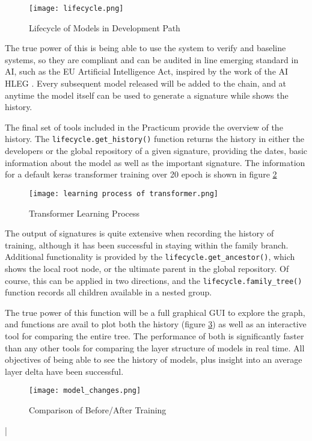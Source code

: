 \begin{figure}[!ht]
    \centering
    \texttt{[image: lifecycle.png]}
    \caption{Lifecycle of Models in Development Path}
    \label{fig:lifecycle_in real}
\end{figure}

The true power of this is being able to use the system to verify and baseline systems, so they are compliant and can be audited in line emerging standard in AI, such as the EU Artificial Intelligence Act, inspired by the work of the AI HLEG \cite{high-levelexpertgrouponaiEthicsGuidelinesTrustworthy2019}. Every subsequent model released will be added to the chain, and at anytime the model itself can be used to generate a signature while shows the history.

The final set of tools included in the Practicum provide the overview of the history. The \verb|lifecycle.get_history()| function returns the history in either the developers or the global repository of a given signature, providing the dates, basic information about the model as well as the important signature. The information for a default keras transformer training over 20 epoch is shown in figure \ref{fig:transformer}

\begin{figure}[!ht]
    \centering
    \texttt{[image: learning process of transformer.png]}
    \caption{Transformer Learning Process}
    \label{fig:transformer}
\end{figure}

The output of signatures is quite extensive when recording the history of training, although it has been successful in staying within the family branch. Additional functionality is provided by the \verb|lifecycle.get_ancestor()|, which shows the local root node, or the ultimate parent in the global repository. Of course, this can be applied in two directions, and the \verb|lifecycle.family_tree()| function records all children available in a nested group.


The true power of this function will be a full graphical GUI to explore the graph, and functions are avail to plot both the history (figure \ref{fig:beforeafter}) as well as an interactive tool for comparing the entire tree. The performance of both is significantly faster than any other tools for comparing the layer structure of models in real time. All objectives of being able to see the history of models, plus insight into an average layer delta have been successful.

\begin{figure}[!h]
    \centering
    \texttt{[image: model\_changes.png]}
    \caption{Comparison of Before/After Training}
    \label{fig:beforeafter}
\end{figure}|








